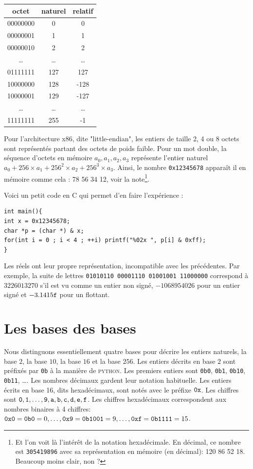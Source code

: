 \documentclass{book}
\newcommand{\python}{\textsc{python}\xspace}
\newcommand{\C}{\textsc{C}\xspace}
\newcommand{\code}[1]{\texttt{#1}}
\newcommand{\hexa}[1]{{\tt 0x#1}}
\newcommand{\bina}[1]{{\tt 0b#1}}
\begin{document}
\begin{center}
	\begin{tabular}{| c | c | c |}
		\hline
		octet & naturel & relatif\\
		\hline
		00000000 & 0 & 0\\
		\hline 00000001 & 1 & 1\\
		\hline 00000010 & 2 & 2\\
		\hline \ldots & \ldots & \ldots\\
		\hline 01111111 & 127 & 127\\
		\hline 10000000 & 128 & -128\\
		\hline 10000001 & 129 & -127\\
		\hline \ldots& \ldots & \ldots\\
		\hline 11111111 & 255 & -1\\
		\hline
	\end{tabular}
\end{center}

Pour l'architecture {\sc x86}, dite "little-endian", les entiers de taille 2, 4 ou 8 octets sont représentés partant des octets de poids faible. Pour un mot double, la séquence d'octets en mémoire $a_0, a_1, a_2, a_3$ représente l'entier naturel $a_0 + 256 \times a_1 + 256^2 \times a_2 + 256^3 \times a_3$. Ainsi, le nombre \code{0x12345678} apparaît il en mémoire comme cela : 
78 56 34 12, voir la note\footnote{Et l'on voit là l'intérêt de la notation hexadécimale. En décimal, ce nombre est \code{305419896} avec sa représentation en mémoire (en décimal): 120 86 52 18. Beaucoup moins clair, non ? }.

Voici un petit code en \C qui permet d'en faire l'expérience :
\begin{verbatim}
int main(){
int x = 0x12345678;
char *p = (char *) & x;
for(int i = 0 ; i < 4 ; ++i) printf("%02x ", p[i] & 0xff);
}
\end{verbatim}

Les réels ont leur propre représentation, incompatible avec les précédentes. Par exemple, la suite de lettres {\tt 01010110\ 00001110\ 01001001\ 11000000} correspond à  $3226013270$ s'il est vu comme un entier non signé, $-1068954026$ pour un entier signé et  $-3.1415{\tt f}$ pour un flottant. 


\section{Les bases des bases}

Nous distinguons essentiellement quatre bases pour décrire les entiers naturels, la base $2$, la base $10$, la base $16$ et la base $256$. Les entiers décrits en base $2$ sont préfixés par {\tt 0b} à la manière de \python. Les premiers entiers sont {\bina{0}, \bina{1}, \bina{10}, \bina{11}, \ldots}.  Les nombres décimaux gardent leur notation habituelle.  Les entiers écrits en base 16, dits hexadécimaux, sont notés avec le préfixe $\tt 0x$. Les chiffres sont $\tt 0, 1, \ldots, 9, a, b, c, d, e, f$. Les chiffres hexadécimaux correspondent aux nombres binaires à 4 chiffres: $\hexa{0} = \bina{0} = 0, \ldots, \hexa{9} = \bina{1001} = 9, \ldots, \hexa{f} = \bina{1111} = 15$. 
\end{document}
